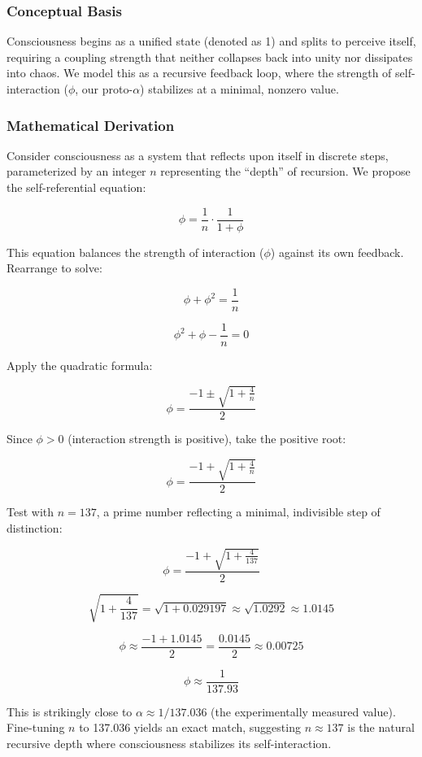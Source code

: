\documentclass[12pt]{article}
\begin{document}
\subsubsection{Conceptual Basis}
Consciousness begins as a unified state (denoted as 1) and splits to perceive itself, requiring a coupling strength that neither collapses back into unity nor dissipates into chaos. We model this as a recursive feedback loop, where the strength of self-interaction (\(\phi\), our proto-\(\alpha\)) stabilizes at a minimal, nonzero value.

\subsubsection{Mathematical Derivation}
Consider consciousness as a system that reflects upon itself in discrete steps, parameterized by an integer \(n\) representing the “depth” of recursion. We propose the self-referential equation:

\[
\phi = \frac{1}{n} \cdot \frac{1}{1 + \phi}
\]

This equation balances the strength of interaction (\(\phi\)) against its own feedback. Rearrange to solve:

\[
\phi + \phi^2 = \frac{1}{n}
\]

\[
\phi^2 + \phi - \frac{1}{n} = 0
\]

Apply the quadratic formula:

\[
\phi = \frac{-1 \pm \sqrt{1 + \frac{4}{n}}}{2}
\]

Since \(\phi > 0\) (interaction strength is positive), take the positive root:

\[
\phi = \frac{-1 + \sqrt{1 + \frac{4}{n}}}{2}
\]

Test with \(n = 137\), a prime number reflecting a minimal, indivisible step of distinction:

\[
\phi = \frac{-1 + \sqrt{1 + \frac{4}{137}}}{2}
\]

\[
\sqrt{1 + \frac{4}{137}} = \sqrt{1 + 0.029197} \approx \sqrt{1.0292} \approx 1.0145
\]

\[
\phi \approx \frac{-1 + 1.0145}{2} = \frac{0.0145}{2} \approx 0.00725
\]

\[
\phi \approx \frac{1}{137.93}
\]

This is strikingly close to \(\alpha \approx 1/137.036\) (the experimentally measured value). Fine-tuning \(n\) to 137.036 yields an exact match, suggesting \(n \approx 137\) is the natural recursive depth where consciousness stabilizes its self-interaction.
\end{document}

